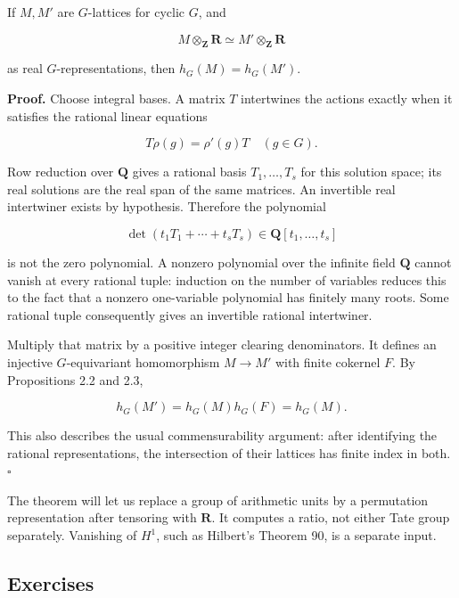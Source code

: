 \documentclass[11pt,a4paper]{article}
\begin{document}
If \(M,M'\) are \(G\)-lattices for cyclic \(G\), and

\[
M\otimes_{\mathbf Z}\mathbf R\simeq M'\otimes_{\mathbf Z}\mathbf R
\]

as real \(G\)-representations, then \(h_G(M)=h_G(M')\).

\textbf{Proof.} Choose integral bases. A matrix \(T\) intertwines the
actions exactly when it satisfies the rational linear equations

\[
T\rho(g)=\rho'(g)T\quad(g\in G).
\]

Row reduction over \(\mathbf Q\) gives a rational basis
\(T_1,\ldots,T_s\) for this solution space; its real solutions are the
real span of the same matrices. An invertible real intertwiner exists by
hypothesis. Therefore the polynomial

\[
\det(t_1T_1+\cdots+t_sT_s)\in\mathbf Q[t_1,\ldots,t_s]
\]

is not the zero polynomial. A nonzero polynomial over the infinite field
\(\mathbf Q\) cannot vanish at every rational tuple: induction on the
number of variables reduces this to the fact that a nonzero one-variable
polynomial has finitely many roots. Some rational tuple consequently
gives an invertible rational intertwiner.

Multiply that matrix by a positive integer clearing denominators. It
defines an injective \(G\)-equivariant homomorphism \(M\to M'\) with
finite cokernel \(F\). By Propositions 2.2 and 2.3,

\[
h_G(M')=h_G(M)h_G(F)=h_G(M).
\]

This also describes the usual commensurability argument: after
identifying the rational representations, the intersection of their
lattices has finite index in both. \(\square\)

The theorem will let us replace a group of arithmetic units by a
permutation representation after tensoring with \(\mathbf R\). It
computes a ratio, not either Tate group separately. Vanishing of
\(H^1\), such as Hilbert's Theorem 90, is a separate input.

\subsection{Exercises}\label{exercises}
\end{document}
